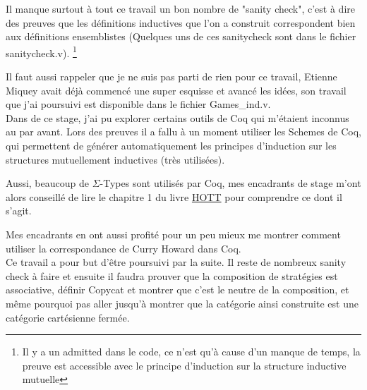 \documentclass[a4paper,12pt]{article}
\begin{document}
Il manque surtout à tout ce travail un bon nombre de "sanity check",
c'est à dire des preuves que les définitions inductives
que l'on a construit correspondent bien aux définitions ensemblistes
(Quelques uns de ces sanitycheck sont dans le fichier sanitycheck.v).
\footnote{Il y a un admitted dans le code, ce n'est qu'à cause d'un manque de
temps, la preuve est accessible avec le principe d'induction sur la structure
inductive mutuelle}

Il faut aussi rappeler que je ne suis pas parti de rien pour ce travail,
Etienne Miquey avait déjà commencé une super esquisse et avancé les idées,
son travail que j'ai poursuivi est disponible dans le
fichier Games\_ind.v.
\\

Dans de ce stage, j'ai pu explorer certains outils de Coq qui m'étaient
inconnus au par avant.
Lors des preuves il a fallu à un moment utiliser les Schemes de Coq,
qui permettent de générer automatiquement les principes d'induction sur les
structures mutuellement inductives (très utilisées).

Aussi, beaucoup de $\Sigma$-Types sont utilisés par Coq, mes encadrants de
stage m'ont alors conseillé de lire le chapitre 1 du livre
\href{https://homotopytypetheory.org/book/}{HOTT} pour
comprendre ce dont il s'agit.

Mes encadrants en ont aussi profité pour un peu mieux me montrer comment utiliser
la correspondance de Curry Howard dans Coq.
\\

Ce travail a pour but d'être poursuivi par la suite. Il reste de nombreux sanity
check à faire et ensuite il faudra prouver que la composition de stratégies est
associative, définir Copycat et montrer que c'est le neutre de la composition,
et même pourquoi pas aller jusqu'à montrer que la catégorie ainsi construite est
une catégorie cartésienne fermée.

\newpage
\end{document}
